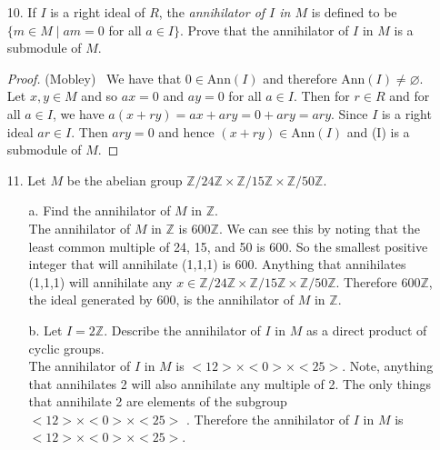 \documentclass[10pt]{article}
\renewcommand{\emptyset}{\varnothing}
\newcommand{\Z}{\mathbb{Z}}
\begin{document}
\begin{itemize}
\item[10.]  If $I$ is a right ideal of $R$, the \textit{annihilator of $I$ in $M$} is defined to be $\lbrace m \in M \mid am = 0$ for all $a\in I\rbrace$.  Prove that the annihilator of $I$ in $M$ is a submodule of $M$.

\begin{proof}(Mobley) \ We have that $0\in \text{Ann}(I)$ and therefore $\text{Ann}(I)\neq\emptyset$.  Let $x,y\in M$ and so $ax=0$ and $ay=0$ for all $a\in I$.  Then for $r \in R$ and for all $a \in I$, we have $a(x+ry)=ax+ary=0+ary=ary$.  Since $I$ is a right ideal $ar\in I$.  Then $ary=0$ and hence $(x+ry)\in \text{Ann}(I)$ and (I) is a submodule of $M$.    
\end{proof}



\item[11.] Let $M$ be the abelian group $\Z/24\Z \times \Z/15\Z \times \Z/50\Z$.

\begin{itemize}
\item[a.] Find the annihilator of $M$ in $\Z$.\\
The annihilator of $M$ in $\Z$ is $600\Z$.  We can see this by
noting that the least common multiple of 24, 15, and 50 is 600.  So
the smallest positive integer that will annihilate (1,1,1) is 600.
Anything that annihilates (1,1,1) will annihilate any $x \in \Z/24\Z
\times \Z/15\Z \times \Z/50\Z$.  Therefore $600\Z$, the ideal
generated by 600, is the annihilator of $M$ in $\Z$.

\item[b.] Let $I = 2\Z$.  Describe the annihilator of $I$ in $M$ as a direct product of cyclic groups.  \\
The annihilator of $I$ in $M$ is $<12>\times <0> \times <25>$.
Note, anything that annihilates 2 will also annihilate any multiple
of 2.  The only things that annihilate 2 are elements of the
subgroup $<12>\times <0> \times <25>$ .  Therefore the annihilator
of $I$ in $M$ is $<12>\times <0> \times <25>$.

\end{itemize}

\end{itemize}
\end{document}

